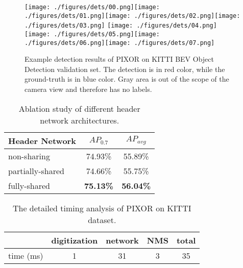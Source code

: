 \begin{figure*}[t]
\begin{center}
   \texttt{[image: ./figures/dets/00.png]}\texttt{[image: ./figures/dets/01.png]}\texttt{[image: ./figures/dets/02.png]}\texttt{[image: ./figures/dets/03.png]}
   \texttt{[image: ./figures/dets/04.png]}\texttt{[image: ./figures/dets/05.png]}\texttt{[image: ./figures/dets/06.png]}\texttt{[image: ./figures/dets/07.png]}
\end{center}
\vspace*{-3mm}
   \caption{Example detection results of PIXOR on KITTI BEV Object Detection validation set. The detection is in red color, while the ground-truth is in blue color. Gray area is out of the scope of the camera view and therefore has no labels.}
\label{fig:det_demo}
\vspace{-0.3cm}
\end{figure*}
\begin{table}[t]
\begin{center}
\begin{small}
\begin{tabular}{|l|cc|}
\hline
Header Network & $AP_{0.7}$ & $AP_{avg}$ \\
\hline
non-sharing & 74.93\% & 55.89\% \\
partially-shared & 74.66\% & 55.75\% \\
fully-shared & {\bf 75.13\%} & {\bf 56.04\%} \\
\hline
\end{tabular}
\caption{Ablation study of different header network architectures.}
\label{tab:subnet}
\end{small}
\end{center}
\vspace{-0.5cm}
\end{table}
\begin{table}[t]
\begin{center}
\begin{small}
\begin{tabular}{|l|ccc|c|}
\hline
 & digitization & network & NMS & total \\
\hline
time (ms) & 1 & 31 & 3 & 35 \\
\hline
\end{tabular}
\caption{The detailed timing analysis of PIXOR on KITTI dataset.}
\label{tab:object_time}
\end{small}
\end{center}
\vspace{-0.5cm}
\end{table}



